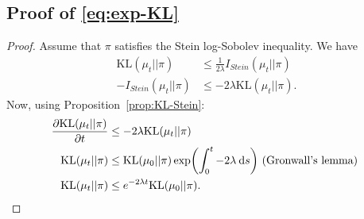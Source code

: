 \documentclass{article}
\newcommand{\KL}{\mathrm{KL}}
\newcommand{\diff}[2]{\frac{\partial #1}{\partial #2}}
\renewcommand{\d}{\: \mathrm{d}}
\DeclarePairedDelimiter{\pare}{(}{)}
\begin{document}
\subsection{Proof of \ref{eq:exp-KL}}\label{pro:exp-KL}
\begin{proof}
  Assume that $\pi$ satisfies the Stein log-Sobolev inequality.
  We have
  \begin{align*}
    \KL(\mu_t || \pi) &\leq \frac{1}{2\lambda} I_{Stein}(\mu_t || \pi)\\
    -I_{Stein}(\mu_t || \pi) &\leq -2\lambda \KL(\mu_t || \pi).
  \end{align*}
  Now, using Proposition~\ref{prop:KL-Stein}:
  \begin{align*}
    \diff{\KL(\mu_t || \pi)}{t} &\leq -2\lambda \KL(\mu_t || \pi) \\
    \KL(\mu_t || \pi) &\leq \KL(\mu_0 || \pi) \exp \pare*{ \int_0^t -2 \lambda \d s }
    \text{ (Gronwall's lemma) } \\
    \KL(\mu_t || \pi) &\leq e^{-2\lambda t} \KL(\mu_0 || \pi).
  \end{align*}
    
\end{proof}
\end{document}
